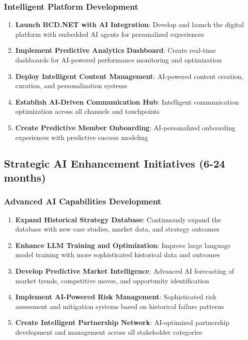 \subsubsection{Intelligent Platform Development}

\begin{enumerate}
    \item \textbf{Launch BCD.NET with AI Integration}: Develop and launch the digital platform with embedded AI agents for personalized experiences
    \item \textbf{Implement Predictive Analytics Dashboard}: Create real-time dashboards for AI-powered performance monitoring and optimization
    \item \textbf{Deploy Intelligent Content Management}: AI-powered content creation, curation, and personalization systems
    \item \textbf{Establish AI-Driven Communication Hub}: Intelligent communication optimization across all channels and touchpoints
    \item \textbf{Create Predictive Member Onboarding}: AI-personalized onboarding experiences with predictive success modeling
\end{enumerate}

\subsection{Strategic AI Enhancement Initiatives (6-24 months)}

\subsubsection{Advanced AI Capabilities Development}

\begin{enumerate}
    \item \textbf{Expand Historical Strategy Database}: Continuously expand the database with new case studies, market data, and strategy outcomes
    \item \textbf{Enhance LLM Training and Optimization}: Improve large language model training with more sophisticated historical data and outcomes
    \item \textbf{Develop Predictive Market Intelligence}: Advanced AI forecasting of market trends, competitive moves, and opportunity identification
    \item \textbf{Implement AI-Powered Risk Management}: Sophisticated risk assessment and mitigation systems based on historical failure patterns
    \item \textbf{Create Intelligent Partnership Network}: AI-optimized partnership development and management across all stakeholder categories
\end{enumerate}

